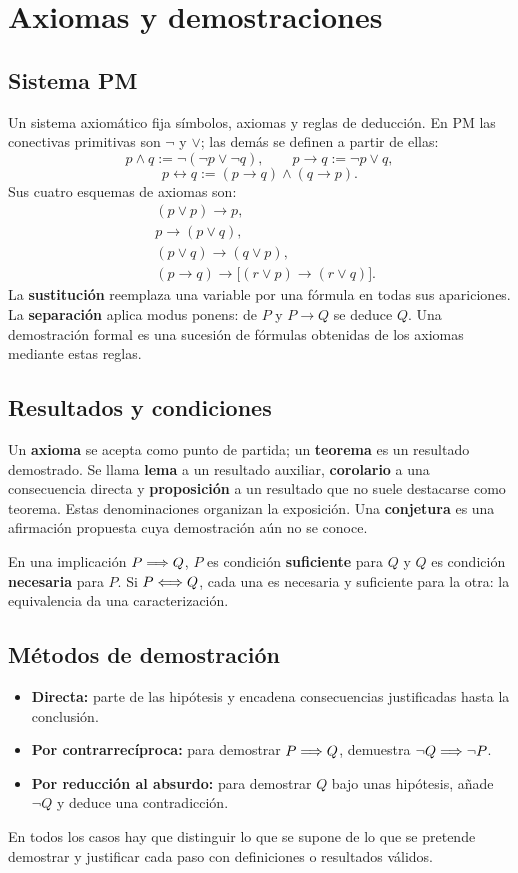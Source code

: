 \section{Axiomas y demostraciones}

\subsection*{Sistema PM}

Un sistema axiomático fija símbolos, axiomas y reglas de deducción.
En PM las conectivas primitivas son $\neg$ y $\vee$; las demás se definen
a partir de ellas:
\[
 p\wedge q:=\neg(\neg p\vee\neg q),\qquad p\to q:=\neg p\vee q,
\]
\[
 p\leftrightarrow q:=(p\to q)\wedge(q\to p).
\]
Sus cuatro esquemas de axiomas son:
\begin{align*}
 &(p\vee p)\to p,\\
 &p\to(p\vee q),\\
 &(p\vee q)\to(q\vee p),\\
 &(p\to q)\to\bigl[(r\vee p)\to(r\vee q)\bigr].
\end{align*}
La \textbf{sustitución} reemplaza una variable por una fórmula en todas
sus apariciones. La \textbf{separación} aplica modus ponens: de $P$
y $P\to Q$ se deduce $Q$. Una demostración formal es una sucesión
de fórmulas obtenidas de los axiomas mediante estas reglas.

\subsection*{Resultados y condiciones}

Un \textbf{axioma} se acepta como punto de partida; un
\textbf{teorema} es un resultado demostrado. Se llama
\textbf{lema} a un resultado auxiliar, \textbf{corolario} a una consecuencia
directa y \textbf{proposición} a un resultado que no suele destacarse como
teorema. Estas denominaciones organizan la exposición.
Una \textbf{conjetura} es una afirmación propuesta cuya demostración
aún no se conoce.

En una implicación $P\Longrightarrow Q$, $P$ es condición \textbf{suficiente} para
$Q$ y $Q$ es condición \textbf{necesaria} para $P$.
Si $P\Longleftrightarrow Q$, cada una es necesaria y suficiente para la otra:
la equivalencia da una caracterización.

\subsection*{Métodos de demostración}

\begin{itemize}
 \item \textbf{Directa:} parte de las hipótesis y encadena consecuencias
       justificadas hasta la conclusión.
 \item \textbf{Por contrarrecíproca:} para demostrar $P\Longrightarrow Q$,
       demuestra $\neg Q\Longrightarrow\neg P$.
 \item \textbf{Por reducción al absurdo:} para demostrar $Q$ bajo unas
       hipótesis, añade $\neg Q$ y deduce una contradicción.
\end{itemize}
En todos los casos hay que distinguir lo que se supone de lo que se
pretende demostrar y justificar cada paso con definiciones o resultados válidos.
